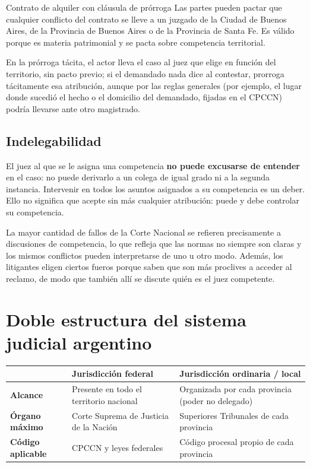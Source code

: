 \documentclass[12pt,oneside]{book}
\renewcommand{\arraystretch}{1.15}
\begin{document}
\begin{ejemplo}{Contrato de alquiler con cláusula de prórroga}
Las partes pueden pactar que cualquier conflicto del contrato se lleve a un juzgado de la Ciudad de Buenos Aires, de la Provincia de Buenos Aires o de la Provincia de Santa Fe. Es válido porque es materia patrimonial y se pacta sobre competencia territorial.
\end{ejemplo}

En la prórroga tácita, el actor lleva el caso al juez que elige en función del territorio, sin pacto previo; si el demandado nada dice al contestar, prorroga tácitamente esa atribución, aunque por las reglas generales (por ejemplo, el lugar donde sucedió el hecho o el domicilio del demandado, fijadas en el CPCCN) podría llevarse ante otro magistrado.

\subsection{Indelegabilidad}

El juez al que se le asigna una competencia \textbf{no puede excusarse de entender} en el caso: no puede derivarlo a un colega de igual grado ni a la segunda instancia. Intervenir en todos los asuntos asignados a su competencia es un deber. Ello no significa que acepte sin más cualquier atribución: puede y debe controlar su competencia.

La mayor cantidad de fallos de la Corte Nacional se refieren precisamente a discusiones de competencia, lo que refleja que las normas no siempre son claras y los mismos conflictos pueden interpretarse de uno u otro modo. Además, los litigantes eligen ciertos fueros porque saben que son más proclives a acceder al reclamo, de modo que también allí se discute quién es el juez competente.

\section{Doble estructura del sistema judicial argentino}

\begin{table}[H]
\centering
\renewcommand{\arraystretch}{1.3}
\begin{tabularx}{\textwidth}{>{\RaggedRight\arraybackslash}p{}>{\RaggedRight\arraybackslash}X>{\RaggedRight\arraybackslash}X}
\toprule
 & \textbf{Jurisdicción federal} & \textbf{Jurisdicción ordinaria / local} \\
\midrule
\textbf{Alcance} & Presente en todo el territorio nacional & Organizada por cada provincia (poder no delegado) \\
\addlinespace
\textbf{Órgano máximo} & Corte Suprema de Justicia de la Nación & Superiores Tribunales de cada provincia \\
\addlinespace
\textbf{Código aplicable} & CPCCN y leyes federales & Código procesal propio de cada provincia \\
\bottomrule
\end{tabularx}
\end{table}
\end{document}
